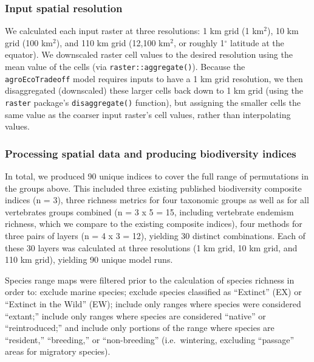 \documentclass[
]{article}
\begin{document}
\hypertarget{input-spatial-resolution}{%
\subsubsection{Input spatial resolution}\label{input-spatial-resolution}}

We calculated each input raster at three resolutions: 1 km grid (1 km\(^2\)), 10 km grid (100 km\(^2\)), and 110 km grid (12,100 km\(^2\), or roughly 1\(^{\circ}\) latitude at the equator). We downscaled raster cell values to the desired resolution using the mean value of the cells (via \texttt{raster::aggregate()}). Because the \texttt{agroEcoTradeoff} model requires inputs to have a 1 km grid resolution, we then disaggregated (downscaled) these larger cells back down to 1 km grid (using the \texttt{raster} package's \texttt{disaggregate()} function), but assigning the smaller cells the same value as the coarser input raster's cell values, rather than interpolating values.

\hypertarget{processing-spatial-data-and-producing-biodiversity-indices}{%
\subsubsection{Processing spatial data and producing biodiversity indices}\label{processing-spatial-data-and-producing-biodiversity-indices}}

In total, we produced 90 unique indices to cover the full range of permutations in the groups above. This included three existing published biodiversity composite indices (n = 3), three richness metrics for four taxonomic groups as well as for all vertebrates groups combined (n = 3 x 5 = 15, including vertebrate endemism richness, which we compare to the existing composite indices), four methods for three pairs of layers (n = 4 x 3 = 12), yielding 30 distinct combinations. Each of these 30 layers was calculated at three resolutions (1 km grid, 10 km grid, and 110 km grid), yielding 90 unique model runs.

Species range maps were filtered prior to the calculation of species richness in order to: exclude marine species; exclude species classified as ``Extinct'' (EX) or ``Extinct in the Wild'' (EW); include only ranges where species were considered ``extant;'' include only ranges where species are considered ``native'' or ``reintroduced;'' and include only portions of the range where species are ``resident,'' ``breeding,'' or ``non-breeding'' (i.e.~wintering, excluding ``passage'' areas for migratory species).
\end{document}
